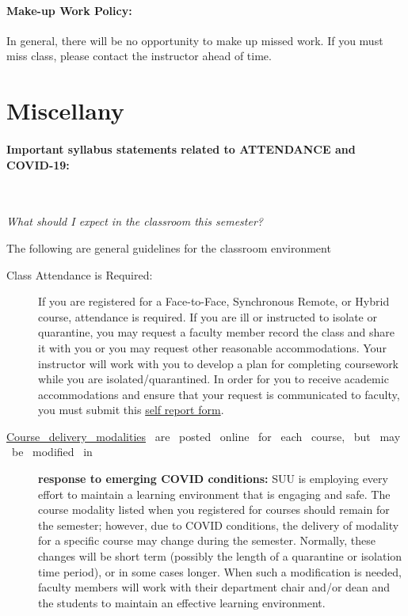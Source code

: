 \documentclass[12pt, letterpaper]{article}
\begin{document}
\paragraph{Make-up Work Policy:}
In general, there will be no opportunity to make up missed work. If you must miss class, please contact the instructor ahead of time.

\section*{Miscellany}
\paragraph{Important syllabus statements related to ATTENDANCE and COVID-19:} ~

\noindent\emph{What should I expect in the classroom this semester?}

\noindent The following are general guidelines for the classroom environment
\begin{description}
	\item[Class Attendance is Required:] If you are registered for a Face-to-Face, Synchronous Remote, or Hybrid course, attendance is required. If you are ill or instructed to isolate or quarantine, you may request a faculty member record the class and share it with you or you may request other reasonable accommodations. Your instructor will work with you to develop a plan for completing coursework while you are isolated/quarantined. In order for you to receive academic accommodations and ensure that your request is communicated to faculty, you must submit this \href{https://my.suu.edu/covid/selfreport/}{self report form}.
	\item[\href{https://www.suu.edu/registrar/onlinehybrid.html}{Course ~delivery ~modalities} ~are ~posted ~online ~for ~each ~course, ~but ~may ~be ~modified ~in] \textbf{response to emerging COVID conditions:} SUU is employing every effort to maintain a learning environment that is engaging and safe. The course modality listed when you registered for courses should remain for the semester; however, due to COVID conditions, the delivery of modality for a specific course may change during the semester. Normally, these changes will be short term (possibly the length of a quarantine or isolation time period), or in some cases longer. When such a modification is needed, faculty members will work with their department chair and/or dean and the students to maintain an effective learning environment.
\end{description}
\end{document}
